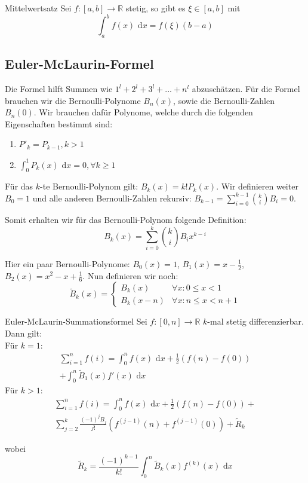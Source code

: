 \documentclass[a4paper,10pt]{article}
\def\R{\mathbb{R}}
\def\dx{\text{ d}x}
\begin{document}
\begin{subbox}{Mittelwertsatz}
	Sei $f:[a,b]\to \mathbb{R}$ stetig, so gibt es $\xi \in [a,b]$ mit
	$$\int_a^bf(x)\dx=f(\xi)(b-a) $$	
\end{subbox}

\subsection{Euler-McLaurin-Formel}
Die Formel hilft Summen wie $1^l + 2^l + 3^l + ... + n^l$ abzuschätzen.
Für die Formel brauchen wir die Bernoulli-Polynome $B_n(x)$, sowie die Bernoulli-Zahlen $B_n(0)$.
Wir brauchen dafür Polynome, welche durch die folgenden Eigenschaften bestimmt sind:

\begin{enumerate}
	\item $P'_k = P_{k-1}, k > 1$
	\item $\int_0^1 P_k(x)\dx = 0, \forall k \geq 1$
\end{enumerate}

Für das $k$-te Bernoulli-Polynom gilt: $B_k(x) = k!P_k(x)$. Wir definieren weiter $B_0=1$ und alle anderen Bernoulli-Zahlen rekursiv: $B_{k-1} = \sum_{i=0}^{k-1}{k \choose i}B_i = 0$.

Somit erhalten wir für das Bernoulli-Polynom folgende Definition: $$B_k(x) = \sum_{i=0}^{k}{k \choose i}B_ix^{k-i}$$

Hier ein paar Bernoulli-Polynome: $B_0(x) = 1$, $B_1(x) = x - \frac{1}{2}$, $B_2(x) = x^2 - x + \frac{1}{6}$. Nun definieren wir noch: $$\tilde{B}_k(x) = \begin{cases}
B_k(x) & \forall x: 0 \leq x < 1 \\
B_k(x-n) & \forall x: n \leq x < n + 1
\end{cases}$$

\begin{mainbox}{Euler-McLaurin-Summationsformel}
	Sei $f: [0, n] \to \R$ $k$-mal stetig differenzierbar. Dann gilt: \\
	Für $k = 1$:
	\begin{align*}
		\sum_{i = 1}^n f(i) = \int_0^n f(x) \dx + \frac{1}{2}(f(n) - f(0)) \\ + \int_0^n \tilde{B}_1(x)f'(x)\dx
	\end{align*}
	Für $k>1$:
	\begin{align*}
		\sum_{i = 1}^n f(i) = \int_0^n f(x) \dx + \frac{1}{2}(f(n) - f(0))+             \\
		\sum_{j = 2}^k \frac{(-1)^j B_j}{j!}(f^{(j-1)}(n) + f^{(j-1)}(0)) + \tilde{R}_k 
	\end{align*}
	  
	wobei
	$$ \tilde{R}_k = \frac{(-1)^{k-1}}{k!} \int_0^n \tilde{B}_k(x)f^{(k)}(x)\dx$$
\end{mainbox}
\end{document}
